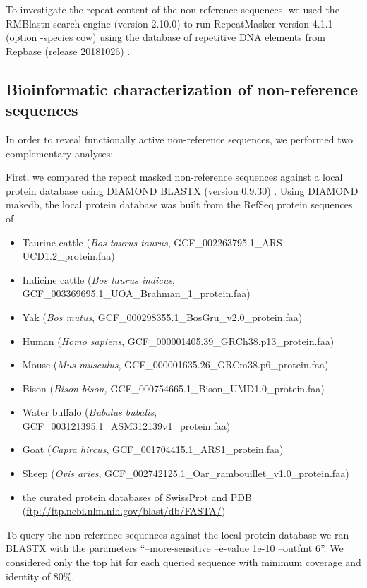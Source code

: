 \documentclass[../main.tex]{subfiles}
\begin{document}
To investigate the repeat content of the non-reference sequences, we used the RMBlastn search engine (version 2.10.0) to run RepeatMasker version 4.1.1 (option -species cow) \citep{Smit2015} using the database of repetitive DNA elements from Repbase (release 20181026) \citep{bao2015repbase}.  

\subsection*{Bioinformatic characterization of non-reference sequences}

In order to reveal functionally active non-reference sequences, we performed two complementary analyses: 

First, we compared the repeat masked non-reference sequences against a local protein database using DIAMOND BLASTX (version 0.9.30) \citep{buchfink2015fast}. Using DIAMOND makedb, the local protein database was built from the RefSeq protein sequences of

\begin{itemize}
\item Taurine cattle (\emph{Bos taurus taurus}, GCF\_002263795.1\_ARS-UCD1.2\_protein.faa)
\item Indicine cattle (\emph{Bos taurus indicus}, GCF\_003369695.1\_UOA\_Brahman\_1\_protein.faa)
\item Yak (\emph{Bos mutus}, GCF\_000298355.1\_BosGru\_v2.0\_protein.faa)
\item Human (\emph{Homo sapiens}, GCF\_000001405.39\_GRCh38.p13\_protein.faa)
\item Mouse (\emph{Mus musculus}, GCF\_000001635.26\_GRCm38.p6\_protein.faa)
\item Bison (\emph{Bison bison,} GCF\_000754665.1\_Bison\_UMD1.0\_protein.faa)
\item Water buffalo (\emph{Bubalus bubalis}, GCF\_003121395.1\_ASM312139v1\_protein.faa)
\item Goat (\emph{Capra hircus}, GCF\_001704415.1\_ARS1\_protein.faa)
\item Sheep (\emph{Ovis aries}, GCF\_002742125.1\_Oar\_rambouillet\_v1.0\_protein.faa)
\item the curated protein databases of SwissProt and PDB (\url{ftp://ftp.ncbi.nlm.nih.gov/blast/db/FASTA/}) 
\end{itemize}


To query the non-reference sequences against the local protein database we ran BLASTX with the parameters “--more-sensitive --e-value 1e-10 --outfmt 6”. We considered only the top hit for each queried sequence with minimum coverage and identity of 80\%.
\end{document}
